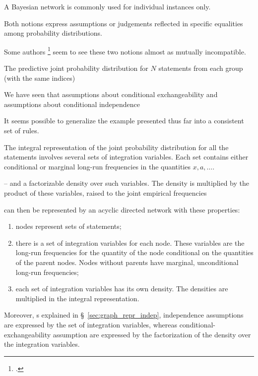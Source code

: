\documentclass[\ifafour a4paper,12pt,\else a5paper,10pt,\fi%
onecolumn,oneside,article,%
british%
]{memoir}
\theoremstyle{remark}
\theoremstyle{innote}
\newcommand*{\citep}{\footcites}
\renewcommand*{\|}[1][]{\nonscript\,#1\vert\nonscript\,\mathopen{}}
\newcommand*{\sect}{\S}%
\renewcommand*{\=}{\TextOrMath\texteq\eq}
\begin{document}
A Bayesian network is commonly used for individual instances only.


Both notions express assumptions or
judgements reflected in specific equalities among probability
distributions.






Some authors
\citep{pearl2000_r2009}[possibly][]{lindleyetal1981} seem to see these two
notions almost as mutually incompatible.




The predictive joint probability distribution for $N$ statements from each
group (with the same indices) 


We have seen that assumptions about conditional exchangeability and
assumptions about conditional independence



It seems possible to generalize the example presented thus far into a
consistent set of rules.

The integral representation of the joint probability distribution for all
the statements involves several sets of integration variables. Each set
contains either conditional or marginal long-run frequencies in the
quantities $x,a, \dotsc$.

-- and a factorizable density
over such variables. The density is multiplied by the product of these
variables, raised to the joint empirical frequencies


can then be represented by an acyclic directed network with
these properties:
\begin{enumerate}
\item nodes represent sets of statements;
\item there is a set of integration variables for each node. These
  variables are the long-run frequencies for the quantity of the node
  conditional on the quantities of the parent nodes. Nodes without parents
  have marginal, unconditional long-run frequencies;
\item each set of integration variables has its own density. The densities
  are multiplied in the integral representation.
\end{enumerate}

Moreover, s explained in \sect~\ref{sec:graph_repr_indep}, independence
assumptions are expressed by the set of integration variables, whereas
conditional-exchangeability assumption are expressed by the factorization
of the density over the integration variables.
\end{document}
